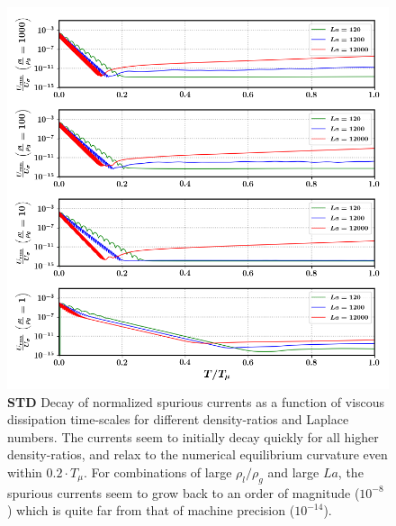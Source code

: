 \begin{figure}[h!]
    \centering
    \includegraphics[]{plots/static_drop/decay_nonmc.png}
	\caption{\textbf{STD} Decay of normalized spurious currents as a function of viscous dissipation time-scales for different density-ratios and Laplace numbers. The currents seem to initially decay quickly for all higher density-ratios, and relax to the numerical equilibrium curvature even within $0.2 \cdot T_\mu$. For combinations of large $\rho_l / \rho_g$ and large $La$, the spurious currents seem to grow back to an order of magnitude ($10^{-8}$) which is quite far from that of machine precision ($10^{-14}$).}   
    \label{decay_nonmc}
\end{figure}

